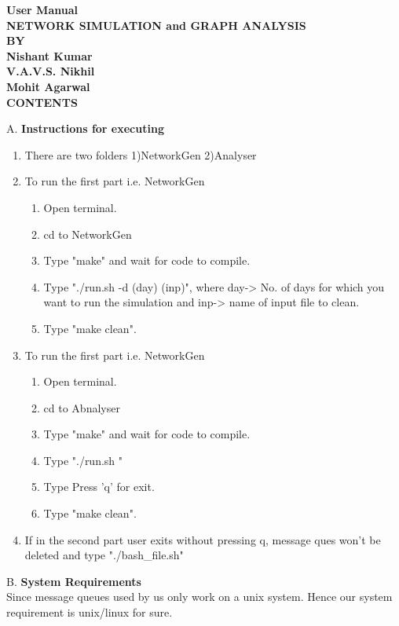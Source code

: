 \documentclass[a4paper,14pt]{article}
\begin{document}
\begin{center}
\Huge\textbf{User Manual}
\\[0.2in]
\huge\textbf{NETWORK SIMULATION and GRAPH ANALYSIS}
\\[0.2in]
\large\textbf{BY}
\\[0.2in]
\Large\textbf{Nishant Kumar}
\\
\Large\textbf{V.A.V.S. Nikhil}
\\
\Large\textbf{Mohit Agarwal}
\\[10in]
\huge\textbf{CONTENTS}
\\[0.4in]
\end{center}
\begin{flushleft}
A. \large\textbf{Instructions for executing}\\
\begin{enumerate}
\item There are two folders 1)NetworkGen 2)Analyser
\item To run the first part i.e. NetworkGen
\begin{enumerate}
\item Open terminal.
\item cd to NetworkGen
\item Type "make" and wait for code to compile.
\item Type "./run.sh -d (day) (inp)", where day-> No. of days for which you want to run the simulation and inp-> name of input file to clean.
\item Type "make clean". 
\end{enumerate}
\item To run the first part i.e. NetworkGen
\begin{enumerate}
\item Open terminal.
\item cd to Abnalyser
\item Type "make" and wait for code to compile.
\item Type "./run.sh "
\item Type Press 'q' for exit.
\item Type "make clean". 
\end{enumerate}
\item If in the second part user exits without pressing q, message ques won't be deleted and type "./bash\_file.sh" 
\end{enumerate}
B.	 \large\textbf{System Requirements}\\
 Since message queues used by us only work on a unix system. Hence our system requirement is unix/linux for sure.

\end{flushleft}
\end{document}
